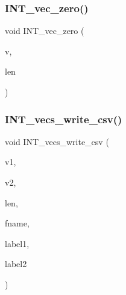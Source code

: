 \mbox{\label{util_8_c_aa8c9c7977203577026080f546fe4980f}} 
\subsubsection{\texorpdfstring{I\+N\+T\+\_\+vec\+\_\+zero()}{INT\_vec\_zero()}}
{\footnotesize\ttfamily void I\+N\+T\+\_\+vec\+\_\+zero (\begin{DoxyParamCaption}\item[{\mbox{\hyperlink{galois_8h_a09fddde158a3a20bd2dcadb609de11dc}{I\+NT}} $\ast$}]{v,  }\item[{\mbox{\hyperlink{galois_8h_a09fddde158a3a20bd2dcadb609de11dc}{I\+NT}}}]{len }\end{DoxyParamCaption})}

\mbox{\label{util_8_c_a4e96bdc24515bb55dbb06a54a9a53c7b}} 
\subsubsection{\texorpdfstring{I\+N\+T\+\_\+vecs\+\_\+write\+\_\+csv()}{INT\_vecs\_write\_csv()}}
{\footnotesize\ttfamily void I\+N\+T\+\_\+vecs\+\_\+write\+\_\+csv (\begin{DoxyParamCaption}\item[{\mbox{\hyperlink{galois_8h_a09fddde158a3a20bd2dcadb609de11dc}{I\+NT}} $\ast$}]{v1,  }\item[{\mbox{\hyperlink{galois_8h_a09fddde158a3a20bd2dcadb609de11dc}{I\+NT}} $\ast$}]{v2,  }\item[{\mbox{\hyperlink{galois_8h_a09fddde158a3a20bd2dcadb609de11dc}{I\+NT}}}]{len,  }\item[{const \mbox{\hyperlink{galois_8h_ab6cc7b4aeb6ea31aba2b3fbfc83ff5e6}{B\+Y\+TE}} $\ast$}]{fname,  }\item[{const \mbox{\hyperlink{galois_8h_ab6cc7b4aeb6ea31aba2b3fbfc83ff5e6}{B\+Y\+TE}} $\ast$}]{label1,  }\item[{const \mbox{\hyperlink{galois_8h_ab6cc7b4aeb6ea31aba2b3fbfc83ff5e6}{B\+Y\+TE}} $\ast$}]{label2 }\end{DoxyParamCaption})}

